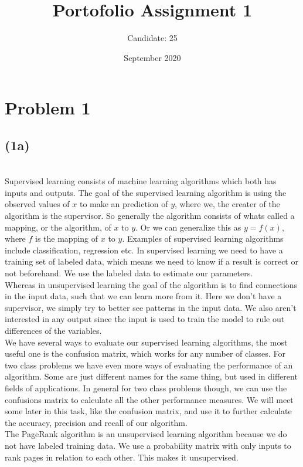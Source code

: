 \documentclass[12pt, letterpaper]{article}
\title{Portofolio Assignment 1}
\author{Candidate: 25}
\date{September 2020}
\begin{document}
  \maketitle
  \thispagestyle{fancy}
  \section*{Problem 1}
    \subsection*{(1a)} \\
      Supervised learning consists of machine learning algorithms which both has inputs and outputs. The goal of the supervised learning algorithm is using the observed values of $x$ to make an prediction of $y$, where we, the creater of the algorithm is the supervisor. So generally the algorithm consists of whats called a mapping, or the algorithm, of $x$ to $y$. Or we can generalize this as $y = f(x)$, where $f$ is the mapping of $x$ to $y$. Examples of supervised learning algorithms include classification, regression etc. In supervised learning we need to have a training set of labeled data, which means we need to know if a result is correct or not beforehand. We use the labeled data to estimate our parameters.\\
      \newline
      Whereas in unsupervised learning the goal of the algorithm is to find connections in the input data, such that we can learn more from it. Here we don't have a supervisor, we simply try to better see patterns in the input data. We also aren't interested in any output since the input is used to train the model to rule out differences of the variables.\\
      \newline
      We have several ways to evaluate our supervised learning algorithms, the most useful one is the confusion matrix, which works for any number of classes. For two class problems we have even more ways of evaluating the performance of an algorithm. Some are just different names for the same thing, but used in different fields of applications. In general for two class problems though, we can use the confusions matrix to calculate all the other performance measures. We will meet some later in this task, like the confusion matrix, and use it to further calculate the accuracy, precision and recall of our algorithm.\\
      \newline
      The PageRank algorithm is an unsupervised learning algorithm because we do not have labeled training data. We use a probability matrix with only inputs to rank pages in relation to each other. This makes it unsupervised.
      \newline
\end{document}
